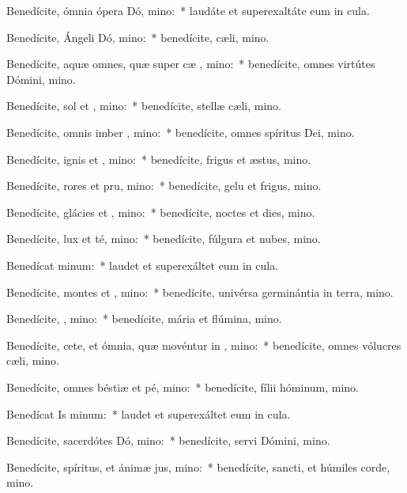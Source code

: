 \item Benedícite, ómnia ópera Dó, mino:~* laudáte et superexaltáte eum in cula.
\item Benedícite, Ángeli Dó, mino:~* benedícite, cæli, mino.
\item Benedícite, aquæ omnes, quæ super cæ , mino:~* benedícite, omnes virtútes Dómini, mino.
\item Benedícite, sol et , mino:~* benedícite, stellæ cæli, mino.
\item Benedícite, omnis imber  , mino:~* benedícite, omnes spíritus Dei, mino.
\item Benedícite, ignis et , mino:~* benedícite, frigus et æstus, mino.
\item Benedícite, rores et pru, mino:~* benedícite, gelu et frigus, mino.
\item Benedícite, glácies et , mino:~* benedícite, noctes et dies, mino.
\item Benedícite, lux et té, mino:~* benedícite, fúlgura et nubes, mino.
\item Benedícat  minum:~* laudet et superexáltet eum in cula.
\item Benedícite, montes et , mino:~* benedícite, univérsa germinántia in terra, mino.
\item Benedícite, , mino:~* benedícite, mária et flúmina, mino.
\item Benedícite, cete, et ómnia, quæ movéntur in , mino:~* benedícite, omnes vólucres cæli, mino.
\item Benedícite, omnes béstiæ et pé, mino:~* benedícite, fílii hóminum, mino.
\item Benedícat Is minum:~* laudet et superexáltet eum in cula.
\item Benedícite, sacerdótes Dó, mino:~* benedícite, servi Dómini, mino.
\item Benedícite, spíritus, et ánimæ jus, mino:~* benedícite, sancti, et húmiles corde, mino.
